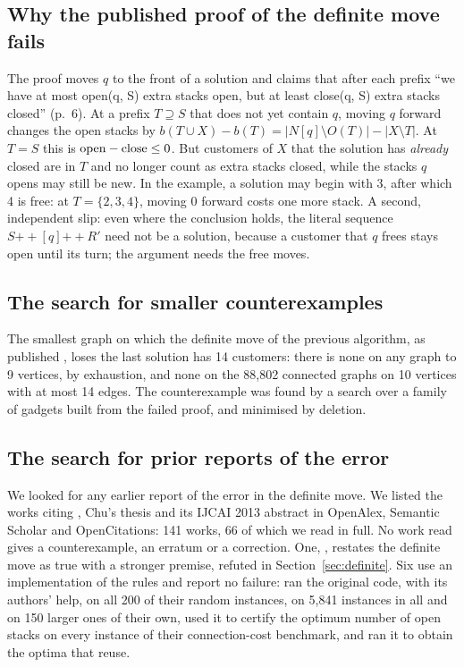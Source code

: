 \subsection{Why the published proof of the definite move fails}
\label{app:whyfails}

The proof moves $q$ to the front of a
solution and claims that after each prefix ``we have at most open(q, S) extra
stacks open, but at least close(q, S) extra stacks closed'' (p.~6). At a prefix
$T\supseteq S$ that does not yet contain $q$, moving $q$ forward changes the open
stacks by $b(T\cup X)-b(T) = |N[q]\setminus O(T)|-|X\setminus T|$. At $T=S$ this
is $\mathrm{open}-\mathrm{close}\le0$. But customers of $X$ that the solution has \emph{already}
closed are in $T$ and no longer count as extra stacks closed, while the stacks
$q$ opens may still be new. In the example, a solution may begin with 3, after
which 4 is free: at $T=\{2,3,4\}$, moving 0 forward costs one more stack. A
second, independent slip: even where the conclusion holds, the literal sequence
$S \mathbin{+\!\!+} [q] \mathbin{+\!\!+} R'$ need not be a solution, because a
customer that $q$ frees stays open until its turn; the argument needs the free
moves.

\subsection{The search for smaller counterexamples}
\label{app:minimality}

The smallest graph on which the definite move of the previous algorithm, as
published \citep[Theorem~1]{ChuStuckey2009}, loses the last solution has 14
customers:
there is none on any graph to 9 vertices, by exhaustion, and none on the 88,802
connected graphs on 10 vertices with at most 14 edges. The counterexample was
found by a search over a family of gadgets built from the failed proof, and
minimised by deletion.

\subsection{The search for prior reports of the error}
\label{app:prior}

We looked for any earlier report of the error in the definite move. We
listed the works citing \citet{ChuStuckey2009}, Chu's thesis and its IJCAI 2013
abstract in OpenAlex, Semantic Scholar and OpenCitations: 141 works, 66 of which we read in full. No work read gives a counterexample, an erratum or a
correction. One, \citet{Fink2012}, restates the definite move as true with a
stronger premise, refuted in Section~\ref{sec:definite}. Six use an
implementation of the rules and report no failure:
\citet{DeGiovanni2010,DeGiovanni2013a} ran the original code, with its
authors' help, on all 200 of their random instances, on 5,841 instances in all
and on 150 larger ones of their own, \citet{DeGiovanni2013b} used it to
certify the optimum number of open stacks on every instance of their
connection-cost benchmark, and \citet{Frinhani2018} ran it to obtain the
optima that \citet{MartinYanassePinto2022} reuse.

